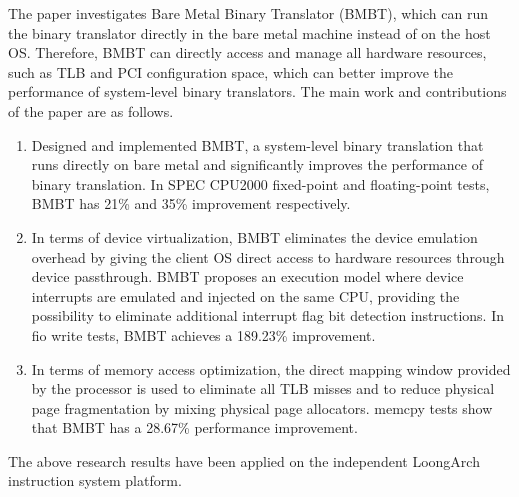 The paper investigates Bare Metal Binary Translator (BMBT), which can run the binary translator directly in the bare metal machine instead of on the host OS. Therefore, BMBT can directly access and manage all hardware resources, such as TLB and PCI configuration space, which can better improve the performance of system-level binary translators.
The main work and contributions of the paper are as follows.
\begin{enumerate}
	\item Designed and implemented BMBT, a system-level binary translation that runs directly on bare metal and significantly improves the performance of binary translation. In SPEC CPU2000 fixed-point and floating-point tests, BMBT has 21\% and 35\% improvement respectively.
	\item In terms of device virtualization, BMBT eliminates the device emulation overhead by giving the client OS direct access to hardware resources through device passthrough. BMBT proposes an execution model where device interrupts are emulated and injected on the same CPU, providing the possibility to eliminate additional interrupt flag bit detection instructions. In fio write tests, BMBT achieves a 189.23\% improvement.
	\item In terms of memory access optimization, the direct mapping window provided by the processor is used to eliminate all TLB misses and to reduce physical page fragmentation by mixing physical page allocators. memcpy tests show that BMBT has a 28.67\% performance improvement.
\end{enumerate}

The above research results have been applied on the independent LoongArch instruction system platform.

